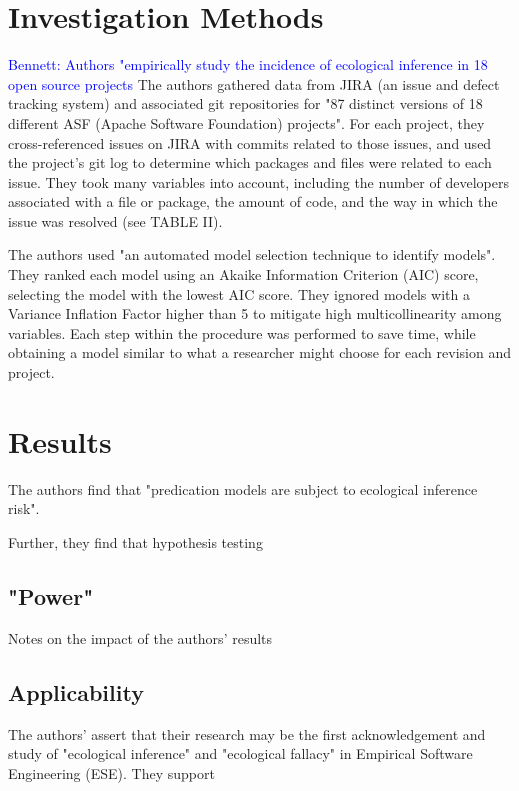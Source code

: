 \documentclass{acm_proc_article-sp}
\newcommand{\commentm}[1]{\textsf{#1}} %
\newcommand{\bennett}[1]{\commentm{\textcolor{blue}{Bennett: #1}}}
\begin{document}
\section{Investigation Methods}
\label{invest}
\bennett{Authors "empirically study the incidence of ecological inference in 18 open source projects}
The authors gathered data from JIRA (an issue and defect tracking system) and associated git repositories for "87 distinct versions of 18 different ASF (Apache Software Foundation) projects".  For each project, they cross-referenced issues on JIRA with commits related to those issues, and used the project's git log to determine which packages and files were related to each issue.  They took many variables into account, including the number of developers associated with a file or package, the amount of code, and the way in which the issue was resolved (see TABLE II).

The authors used "an automated model selection technique to identify models".  They ranked each model using an Akaike Information Criterion (AIC) score, selecting the model with the lowest AIC score.  They ignored models with a Variance Inflation Factor higher than 5 to mitigate high multicollinearity among variables.  Each step within the procedure was performed to save time, while obtaining a model similar to what a researcher might choose for each revision and project.

\section{Results}
\label{results}
The authors find that "predication models are subject to ecological inference risk".  

Further, they find that hypothesis testing 

\subsection{"Power"}
\label{results-power}
Notes on the impact of the authors' results

\subsection{Applicability}
\label{results-apply}
The authors' assert that their research may be the first acknowledgement and study of "ecological inference" and "ecological fallacy" in Empirical Software Engineering (ESE).  They support 
\end{document}
